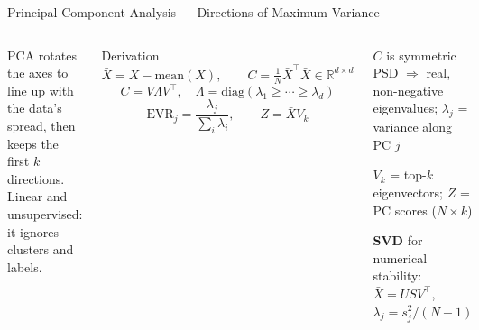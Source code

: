 \documentclass[aspectratio=169,10pt,t]{beamer}
\begin{document}
\begin{frame}{Principal Component Analysis --- Directions of Maximum Variance}
\begin{columns}[T]
\begin{ibox}\scriptsize PCA rotates the axes to line up with the data's spread, then keeps the first $k$ directions. Linear and unsupervised: it ignores clusters and labels.\end{ibox}
\begin{fbx}{Derivation}\[\bar X=X-\text{mean}(X),\qquad C=\tfrac1N\bar X^{\top}\bar X\in\mathbb{R}^{d\times d}\]\[C=V\Lambda V^{\top},\quad\Lambda=\text{diag}(\lambda_1\ge\cdots\ge\lambda_d)\]\[\text{EVR}_j=\frac{\lambda_j}{\sum_i\lambda_i},\qquad Z=\bar XV_k\]\end{fbx}
\begin{tl}\item $C$ is symmetric PSD $\Rightarrow$ real, non-negative eigenvalues; $\lambda_j$ = variance along PC $j$\item $V_k$ = top-$k$ eigenvectors; $Z$ = PC scores ($N\times k$)\item \textbf{SVD} for numerical stability: $\bar X=USV^{\top}$, $\lambda_j=s_j^2/(N-1)$\end{tl}
\end{columns}
\end{frame}
\end{document}
